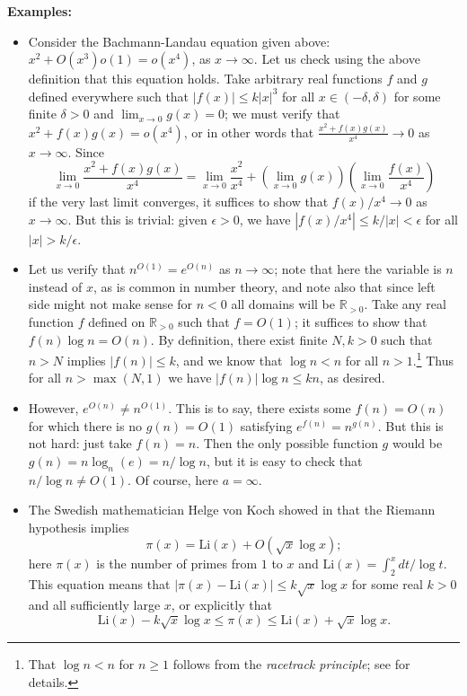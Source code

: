 \documentclass{article}
\theoremstyle{definition}
\newcommand\RR{\mathbb R}
\newcommand\abs[1]{\left\lvert#1\right\rvert}
\newcommand\Li{\mathrm{Li}}
\begin{document}
\textbf{Examples:}

\begin{itemize}
    \item Consider the Bachmann-Landau equation given above: \(x^2 + O(x^3)o(1) = o(x^4)\), as \(x\to\infty\).
        Let us check using the above definition that this equation holds.
        Take arbitrary real functions \(f\) and \(g\) defined everywhere such that \(\abs{f(x)} \leq k\abs{x}^3\) for all \(x\in(-\delta,\delta)\) for some finite \(\delta>0\) and \(\lim_{x\to 0} g(x) = 0\); we must verify that \(x^2 + f(x)g(x) = o(x^4)\), or in other words that \(\frac{x^2 + f(x)g(x)}{x^4}\to 0\) as \(x\to\infty\).
        Since
        \[\lim_{x\to 0} \frac{x^2 + f(x)g(x)}{x^4} = \lim_{x\to 0} \frac{x^2}{x^4} + \left(\lim_{x\to 0} g(x)\right)\left(\lim_{x\to 0} \frac{f(x)}{x^4}\right)\]
        if the very last limit converges, it suffices to show that \(f(x)/x^4 \to 0\) as \(x\to\infty\).
        But this is trivial: given \(\epsilon > 0\), we have \(\abs{f(x)/x^4} \le k/\abs{x} < \epsilon\) for all \(\abs{x} > k/\epsilon\).

    \item Let us verify that \(n^{O(1)} = e^{O(n)}\) as \(n\to\infty\); note that here the variable is \(n\) instead of \(x\), as is common in number theory, and note also that since left side might not make sense for \(n<0\) all domains will be \(\RR_{>0}\).
        Take any real function \(f\) defined on \(\RR_{>0}\) such that \(f = O(1)\); it suffices to show that \(f(n)\log n = O(n)\).
        By definition, there exist finite \(N,k>0\) such that \(n>N\) implies \(\abs{f(n)} \le k\), and we know that \(\log n < n\) for all \(n>1\).\footnote{That \(\log n < n\) for \(n\ge 1\) follows from the \textit{racetrack principle}; see \cite{Spivey2011} for details.}
        Thus for all \(n > \max(N,1)\) we have \(\abs{f(n)}\log n \le kn\), as desired.

    \item However, \(e^{O(n)} \ne n^{O(1)}\).
        This is to say, there exists some \(f(n) = O(n)\) for which there is no \(g(n) = O(1)\) satisfying \(e^{f(n)} = n^{g(n)}\).
        But this is not hard: just take \(f(n) = n\).
        Then the only possible function \(g\) would be \(g(n) = n\log_n(e) = n/\log n\), but it is easy to check that \(n/\log n \ne O(1)\).
        Of course, here \(a=\infty\).

    \item The Swedish mathematician Helge von Koch showed in \cite{Koch1901} that the Riemann hypothesis implies
        \[\pi(x) = \Li(x) + O(\sqrt x \log x);\]
        here \(\pi(x)\) is the number of primes from \(1\) to \(x\) and \(\Li(x) = \int_2^x dt/\log t\).
        This equation means that \(\abs{\pi(x) - \Li(x)} \le k\sqrt x \log x\) for some real \(k>0\) and all sufficiently large \(x\), or explicitly that
        \[\Li(x) - k\sqrt x \log x \le \pi(x) \le \Li(x) + \sqrt x\log x.\]
\end{itemize}
\end{document}
